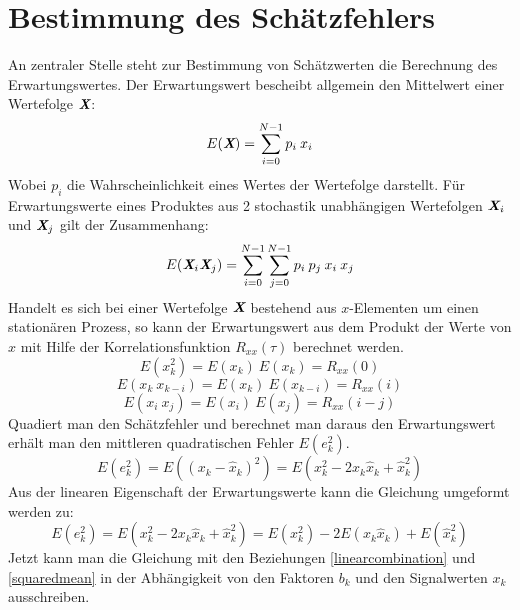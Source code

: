 \documentclass[
    10pt, %
    DIV12,
    english, %
    a5paper, %
    twoside, %
    titlepage, %
    parskip=half, %
    headings=small, %
    listof=totoc, %
    bibliography=totoc, %
    index=totoc, %
    captions=tableheading, %
    final %
]{scrbook}
\begin{document}
\raggedbottom

\section{Bestimmung des Schätzfehlers}
An zentraler Stelle steht zur Bestimmung von Schätzwerten die Berechnung des Erwartungswertes. Der Erwartungswert bescheibt allgemein den Mittelwert einer Wertefolge 
$\textit{\textbf{X}}$:
\begin{equation}
E(\textit{\textbf{X}})=\sum_{i=0}^{N-1} p_i\:x_i\nonumber
\end{equation}
Wobei $p_i$ die Wahrscheinlichkeit eines Wertes der Wertefolge darstellt. Für Erwartungswerte eines Produktes aus 2 stochastik unabhängigen Wertefolgen 
$\textit{\textbf{X}}_i$ und $\textit{\textbf{X}}_j$ 
gilt der Zusammenhang:
\begin{equation}\label{twovariables}
E(\textit{\textbf{X}}_i\textit{\textbf{X}}_j)=\sum_{i=0}^{N-1}\sum_{j=0}^{N-1} p_i\:p_j\:x_i\:x_j
\end{equation}
Handelt es sich bei einer Wertefolge $\textit{\textbf{X}}$ bestehend aus $x$-Elementen um einen stationären Prozess, so kann der Erwartungswert aus dem Produkt der Werte von $x$ mit Hilfe der Korrelationsfunktion 
$R_{xx}(\tau)$ berechnet werden.
\begin{equation}\label{squaredmean}
E(x_k^2)=E(x_k)\:E(x_k)=R_{xx}(0)
\end{equation}
\begin{equation}\label{squaredmean2}
E(x_k\:x_{k-i})=E(x_k)\:E(x_{k-i})=R_{xx}(i)
\end{equation}
\begin{equation}\label{squaredmean3}
E(x_i\:x_j)=E(x_i)\:E(x_j)=R_{xx}(i-j)
\end{equation}
Quadiert man den Schätzfehler und berechnet man daraus den Erwartungswert erhält man den mittleren quadratischen Fehler $E(e_k^2)$.
\begin{equation}
E(e_k^2)=E((x_k-\hat{x}_k)^2)=E(x_k^2-2x_k\hat{x}_k+\hat{x}_k^2)\nonumber
\end{equation}
Aus der linearen Eigenschaft der Erwartungswerte kann die Gleichung umgeformt werden zu:
\begin{equation}\label{linear}
E(e_k^2)=E(x_k^2-2x_k\hat{x}_k+\hat{x}_k^2)=E(x_k^2)-2E(x_k\hat{x}_k)+E(\hat{x}_k^2)
\end{equation}
Jetzt kann man die Gleichung mit den Beziehungen \eqref{linearcombination} und \eqref{squaredmean} in der Abhängigkeit von den Faktoren $b_k$ und den Signalwerten $x_k$ ausschreiben.
\end{document}
